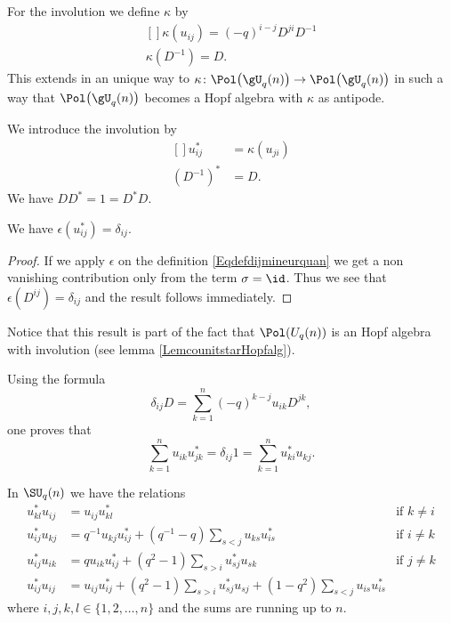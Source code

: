 For the involution we define $\kappa$ by
\begin{equation}        \label{EqDefInvolutionSSUqn}
    \begin{aligned}[]
        \kappa(u_{ij})=(-q)^{i-j}D^{ji}D^{-1}\\
        \kappa(D^{-1})=D.
    \end{aligned}
\end{equation}
This extends in an unique way to $\kappa\colon \Pol\big( \gU_q(n) \big)\to \Pol\big( \gU_q(n) \big)$ in such a way that $\Pol\big( \gU_q(n) \big)$ becomes a Hopf algebra with $\kappa$ as antipode.

We introduce the involution by
\begin{equation}
    \begin{aligned}[]
        u_{ij}^*&=\kappa(u_{ji})\\
        (D^{-1})^*&=D.
    \end{aligned}
\end{equation}
We have $DD^*=1=D^*D$.

\begin{lemma}
    We have \( \epsilon(u_{ij}^*)=\delta_{ij}\).
\end{lemma}

\begin{proof}
    If we apply \( \epsilon\) on the definition \eqref{Eqdefdijmineurquan} we get a non vanishing contribution only from the term \( \sigma=\id\). Thus we see that \( \epsilon(D^{ij})=\delta_{ij}\) and the result follows immediately.
\end{proof}
Notice that this result is part of the fact that \( \Pol(U_q(n))\) is an Hopf algebra with involution (see lemma \ref{LemcounitstarHopfalg}).


Using the formula
\begin{equation}
    \delta_{ij}D=\sum_{k=1}^n(-q)^{k-j}u_{ik}D^{jk},
\end{equation}
one proves that
\begin{equation}        \label{Equustrunsuqn}
    \sum_{k=1}^nu_{ik}u^*_{jk}=\delta_{ij}1=\sum_{k=1}^nu_{ki}^*u_{kj}.
\end{equation}

\begin{lemma}
    In \( \SU_q(n)\) we have the relations\cite{Koelink,Bragiel}
    \begin{subequations}
        \begin{align}
        u^*_{kl}u_{ij}&=u_{ij}u^*_{kl}&\text{if }k\neq i\label{eqREflsuusikl}\\
        u_{ij}^*u_{kj}&=q^{-1}u_{kj}u^*_{ij}+(q^{-1}-q)\sum_{s<j}u_{ks}u^*_{is}&\text{if }i\neq k     \label{subequkluijeqkneqiuust}\\
        u^*_{ij}u_{ik}&=qu_{ik}u_{ij}^*+(q^2-1)\sum_{s>i}u^*_{sj}u_{sk}&\text{if }j\neq k\\
        u^*_{ij}u_{ij}&=u_{ij}u_{ij}^*+(q^2-1)\sum_{s>i}u^*_{sj}u_{sj}+(1-q^2)\sum_{s<j}u_{is}u^*_{is}\label{EqLemsumsumstarpar}
        \end{align}
    \end{subequations}
    where \( i,j,k,l\in\{ 1,2,\ldots,n \}\) and the sums are running up to \( n\).
\end{lemma}

